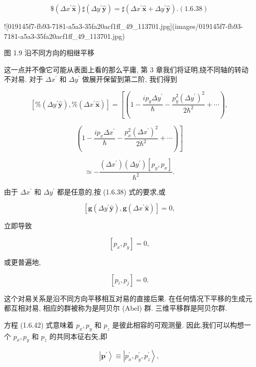 \documentclass[lang=cn,newtx,10pt,scheme=chinese,thmcnt=section]{elegantbook}
\begin{document}
$$
\$ \left( {\Delta {x}^{\prime }\widehat{\mathbf{x}}}\right) \sharp \left( {\Delta {y}^{\prime }\widehat{\mathbf{y}}}\right) = \sharp \left( {\Delta {x}^{\prime }\widehat{\mathbf{x}} + \Delta {y}^{\prime }\widehat{\mathbf{y}}}\right) .\left( {1.6.38}\right) \tag{1. 6.38}
$$

![019145f7-fb93-7181-a5a3-35fa20acf1ff_49_113701.jpg](images/019145f7-fb93-7181-a5a3-35fa20acf1ff_49_113701.jpg)

图 1.9 沿不同方向的相继平移

这一点并不像它可能从表面上看的那么平庸, 第 3 章我们将证明,绕不同轴的转动不对易. 对于 $\Delta {x}^{\prime }$ 和 $\Delta {y}^{\prime }$ 做展开保留到第二阶, 我们得到

$$
\left\lbrack {\% \left( {\Delta {y}^{\prime }\widehat{\mathbf{y}}}\right) ,\% \left( {\Delta {x}^{\prime }\widehat{\mathbf{x}}}\right) }\right\rbrack = \left\lbrack {\left( {1 - \frac{i{p}_{y}\Delta {y}^{\prime }}{\hbar } - \frac{{p}_{y}^{2}{\left( \Delta {y}^{\prime }\right) }^{2}}{2{\hbar }^{2}} + \cdots }\right) ,}\right.
$$

$$
\left. \left( {1 - \frac{i{p}_{x}\Delta {x}^{\prime }}{\hbar } - \frac{{p}_{x}^{2}{\left( \Delta {x}^{\prime }\right) }^{2}}{2{\hbar }^{2}} + \cdots }\right) \right\rbrack \tag{1.6.39}
$$

$$
\simeq - \frac{\left( {\Delta {x}^{\prime }}\right) \left( {\Delta {y}^{\prime }}\right) \left\lbrack {{p}_{y},{p}_{x}}\right\rbrack }{{\hbar }^{2}}.
$$

由于 $\Delta {x}^{\prime }$ 和 $\Delta {y}^{\prime }$ 都是任意的,按 (1.6.38) 式的要求,或

$$
\left\lbrack {\mathbf{g}\left( {\Delta {y}^{\prime }\widehat{\mathbf{y}}}\right) ,\mathbf{g}\left( {\Delta {x}^{\prime }\widehat{\mathbf{x}}}\right) }\right\rbrack = 0, \tag{1.6.40}
$$

立即导致

$$
\left\lbrack {{p}_{x},{p}_{y}}\right\rbrack = 0, \tag{1.6.41}
$$

或更普遍地,

$$
\left\lbrack {{p}_{i},{p}_{j}}\right\rbrack = 0. \tag{1.6.42}
$$

这个对易关系是沿不同方向平移相互对易的直接后果. 在任何情况下平移的生成元都互相对易, 相应的群被称为是阿贝尔 (Abel) 群. 三维平移群是阿贝尔群.

方程 (1.6.42) 式意味着 ${p}_{x},{p}_{y}$ 和 ${p}_{z}$ 是彼此相容的可观测量. 因此,我们可以构想一个 ${p}_{x},{p}_{y}$ 和 ${p}_{z}$ 的共同本征右矢,即

$$
\left| {\mathbf{p}}^{\prime }\right\rangle \equiv \left| {{p}_{x}^{\prime },{p}_{y}^{\prime },{p}_{z}^{\prime }}\right\rangle ,
$$
\end{document}
